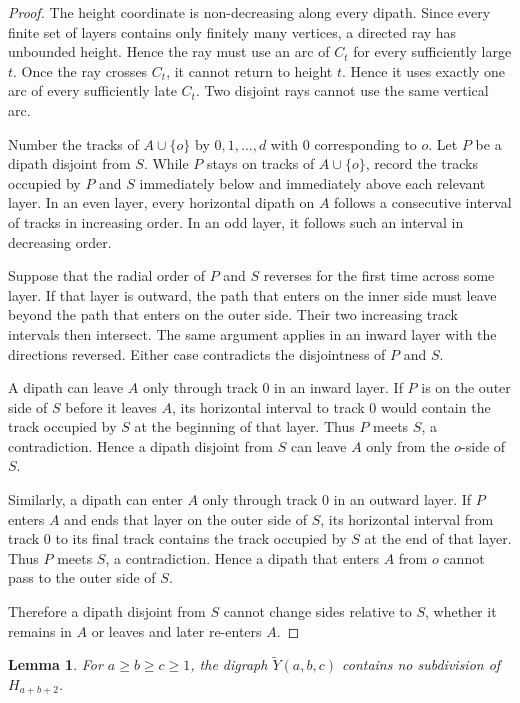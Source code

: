 \documentclass[11pt]{article}
\newtheorem{lemma}[theorem]{Lemma}
\theoremstyle{remark}
\numberwithin{equation}{section}
\begin{document}
\begin{proof}
The height coordinate is non-decreasing along every dipath. Since every finite set of layers contains only finitely many vertices, a directed ray has unbounded height. Hence the ray must use an arc of $C_t$ for every sufficiently large $t$. Once the ray crosses $C_t$, it cannot return to height $t$. Hence it uses exactly one arc of every sufficiently late $C_t$. Two disjoint rays cannot use the same vertical arc.

Number the tracks of $A\cup\{o\}$ by $0,1,\ldots,d$ with $0$ corresponding to $o$. Let $P$ be a dipath disjoint from $S$. While $P$ stays on tracks of $A\cup\{o\}$, record the tracks occupied by $P$ and $S$ immediately below and immediately above each relevant layer. In an even layer, every horizontal dipath on $A$ follows a consecutive interval of tracks in increasing order. In an odd layer, it follows such an interval in decreasing order.

Suppose that the radial order of $P$ and $S$ reverses for the first time across some layer. If that layer is outward, the path that enters on the inner side must leave beyond the path that enters on the outer side. Their two increasing track intervals then intersect. The same argument applies in an inward layer with the directions reversed. Either case contradicts the disjointness of $P$ and $S$.

A dipath can leave $A$ only through track $0$ in an inward layer. If $P$ is on the outer side of $S$ before it leaves $A$, its horizontal interval to track $0$ would contain the track occupied by $S$ at the beginning of that layer. Thus $P$ meets $S$, a contradiction. Hence a dipath disjoint from $S$ can leave $A$ only from the $o$-side of $S$.

Similarly, a dipath can enter $A$ only through track $0$ in an outward layer. If $P$ enters $A$ and ends that layer on the outer side of $S$, its horizontal interval from track $0$ to its final track contains the track occupied by $S$ at the end of that layer. Thus $P$ meets $S$, a contradiction. Hence a dipath that enters $A$ from $o$ cannot pass to the outer side of $S$.

Therefore a dipath disjoint from $S$ cannot change sides relative to $S$, whether it remains in $A$ or leaves and later re-enters $A$.
\end{proof}

\begin{lemma}\label{lem:Stein-obstruction}
For $a\ge b\ge c\ge1$, the digraph $\widetilde{Y}(a,b,c)$ contains no subdivision of $H_{a+b+2}$.
\end{lemma}
\end{document}
